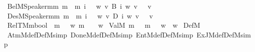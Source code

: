 \begin{isabellebody}
\isamarkupfalse%
\ BelM{\isacharcolon}{\kern0pt}{\isacharcolon}{\kern0pt}{\isachardoublequoteopen}Speaker{\isasymRightarrow}{\isasymsigma}\isactrlsub m{\isasymRightarrow}{\isasymsigma}\isactrlsub m{\isachardoublequoteclose}\ {\isacharparenleft}{\kern0pt}{\isachardoublequoteopen}{\isasymB}\isactrlsup m{\isachardoublequoteclose}{\isacharparenright}{\kern0pt}\ \ {\isachardoublequoteopen}{\isasymB}\isactrlsup m\ i\ {\isasymphi}\ {\isasymequiv}\ {\isasymlambda}w{\isachardot}{\kern0pt}\ {\isasymforall}v{\isachardot}{\kern0pt}\ B\ i\ w\ v\ {\isasymlongrightarrow}\ {\isasymphi}\ v{\isachardoublequoteclose}\isanewline
{}\isamarkupfalse%
\ DesM{\isacharcolon}{\kern0pt}{\isacharcolon}{\kern0pt}{\isachardoublequoteopen}Speaker{\isasymRightarrow}{\isasymsigma}\isactrlsub m{\isasymRightarrow}{\isasymsigma}\isactrlsub m{\isachardoublequoteclose}\ {\isacharparenleft}{\kern0pt}{\isachardoublequoteopen}{\isasymD}\isactrlsup m{\isachardoublequoteclose}{\isacharparenright}{\kern0pt}\ \ {\isachardoublequoteopen}{\isasymD}\isactrlsup m\ i\ {\isasymphi}\ {\isasymequiv}\ {\isasymlambda}w{\isachardot}{\kern0pt}\ {\isasymforall}v{\isachardot}{\kern0pt}\ D\ i\ w\ v\ {\isasymlongrightarrow}\ {\isasymphi}\ v{\isachardoublequoteclose}\isanewline
\isanewline
{}\isamarkupfalse%
\ RelTM{\isacharcolon}{\kern0pt}{\isacharcolon}{\kern0pt}{\isachardoublequoteopen}{\isasymw}{\isasymRightarrow}{\isasymsigma}\isactrlsub m{\isasymRightarrow}bool{\isachardoublequoteclose}\ {\isacharparenleft}{\kern0pt}{\isachardoublequoteopen}{\isacharunderscore}{\kern0pt}\ {\isasymTurnstile}\isactrlsup m\ {\isacharunderscore}{\kern0pt}{\isachardoublequoteclose}{\isacharparenright}{\kern0pt}\ \ {\isachardoublequoteopen}w\ {\isasymTurnstile}\isactrlsup m\ {\isasymphi}\ {\isasymequiv}\ {\isasymphi}\ w{\isachardoublequoteclose}\isanewline
{}\isamarkupfalse%
\ ValM\ {\isacharparenleft}{\kern0pt}{\isachardoublequoteopen}{\isasymTurnstile}\isactrlsup m\ {\isacharunderscore}{\kern0pt}{\isachardoublequoteclose}{\isacharparenright}{\kern0pt}\ \ {\isachardoublequoteopen}{\isasymTurnstile}\isactrlsup m\ {\isasymphi}\ {\isasymequiv}\ {\isasymforall}w{\isachardot}{\kern0pt}\ {\isasymphi}\ w{\isachardoublequoteclose}\isanewline
\isanewline
{}\isamarkupfalse%
\ DefM\isanewline
{}\isamarkupfalse%
\ AtmM{\isacharunderscore}{\kern0pt}def{\isacharbrackleft}{\kern0pt}DefM{\isacharcomma}{\kern0pt}simp{\isacharbrackright}{\kern0pt}\ DoneM{\isacharunderscore}{\kern0pt}def{\isacharbrackleft}{\kern0pt}DefM{\isacharcomma}{\kern0pt}simp{\isacharbrackright}{\kern0pt}\ EntM{\isacharunderscore}{\kern0pt}def{\isacharbrackleft}{\kern0pt}DefM{\isacharcomma}{\kern0pt}simp{\isacharbrackright}{\kern0pt}\ ExJM{\isacharunderscore}{\kern0pt}def{\isacharbrackleft}{\kern0pt}DefM{\isacharcomma}{\kern0pt}simp{\isacharbrackright}{\kern0pt}\isanewline

\end{isabellebody}
